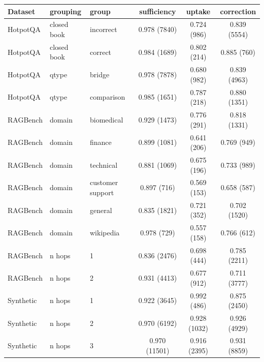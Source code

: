 \begin{tabular}{lllccc}
\toprule
Dataset & grouping & group & sufficiency & uptake & correction \\
\midrule
HotpotQA & closed book & incorrect & 0.978 (7840) & 0.724 (986) & 0.839 (5554) \\
HotpotQA & closed book & correct & 0.984 (1689) & 0.802 (214) & 0.885 (760) \\
HotpotQA & qtype & bridge & 0.978 (7878) & 0.680 (982) & 0.839 (4963) \\
HotpotQA & qtype & comparison & 0.985 (1651) & 0.787 (218) & 0.880 (1351) \\
RAGBench & domain & biomedical & 0.929 (1473) & 0.776 (291) & 0.818 (1331) \\
RAGBench & domain & finance & 0.899 (1081) & 0.641 (206) & 0.769 (949) \\
RAGBench & domain & technical & 0.881 (1069) & 0.675 (196) & 0.733 (989) \\
RAGBench & domain & customer support & 0.897 (716) & 0.569 (153) & 0.658 (587) \\
RAGBench & domain & general & 0.835 (1821) & 0.721 (352) & 0.702 (1520) \\
RAGBench & domain & wikipedia & 0.978 (729) & 0.557 (158) & 0.766 (612) \\
RAGBench & n hops & 1 & 0.836 (2476) & 0.698 (444) & 0.785 (2211) \\
RAGBench & n hops & 2 & 0.931 (4413) & 0.677 (912) & 0.711 (3777) \\
Synthetic & n hops & 1 & 0.922 (3645) & 0.992 (486) & 0.875 (2450) \\
Synthetic & n hops & 2 & 0.970 (6192) & 0.928 (1032) & 0.926 (4929) \\
Synthetic & n hops & 3 & 0.970 (11501) & 0.916 (2395) & 0.931 (8859) \\
\bottomrule
\end{tabular}